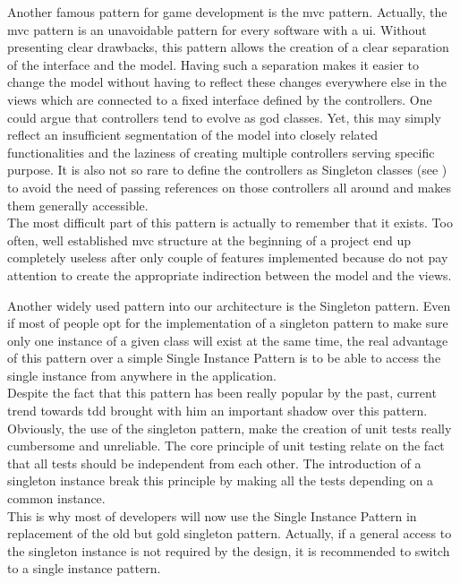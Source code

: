 Another famous pattern for game development is the \gls{mvc} pattern. Actually, the \gls{mvc} pattern is an unavoidable pattern for every software with a \gls{ui}. Without presenting clear drawbacks, this pattern allows the creation of a clear separation of the interface and the model. Having such a separation makes it easier to change the model without having to reflect these changes everywhere else in the views which are connected to a fixed interface defined by the controllers. One could argue that controllers tend to evolve as god classes. Yet, this may simply reflect an insufficient segmentation of the model into closely related functionalities and the laziness of creating multiple controllers serving specific purpose. It is also not so rare to define the controllers as Singleton classes (see ) to avoid the need of passing references on those controllers all around and makes them generally accessible. \cite{wiki:mvc} \\

The most difficult part of this pattern is actually to remember that it exists. Too often, well established \gls{mvc} structure at the beginning of a project end up completely useless after only couple of features implemented because do not pay attention to create the appropriate indirection between the model and the views.

Another widely used pattern into our architecture is the Singleton pattern. Even if most of people opt for the implementation of a singleton pattern to make sure only one instance of a given class will exist at the same time, the real advantage of this pattern over a simple Single Instance Pattern is to be able to access the single instance from anywhere in the application. \cite{wiki:singleton} \\

Despite the fact that this pattern has been really popular by the past, current trend towards \gls{tdd} brought with him an important shadow over this pattern. Obviously, the use of the singleton pattern, make the creation of unit tests really cumbersome and unreliable. The core principle of unit testing relate on the fact that all tests should be independent from each other. The introduction of a singleton instance break this principle by making all the tests depending on a common instance. \\

This is why most of developers will now use the Single Instance Pattern in replacement of the old but gold singleton pattern. Actually, if a general access to the singleton instance is not required by the design, it is recommended to switch to a single instance pattern. \cite{singletonVSsingleInstance}

